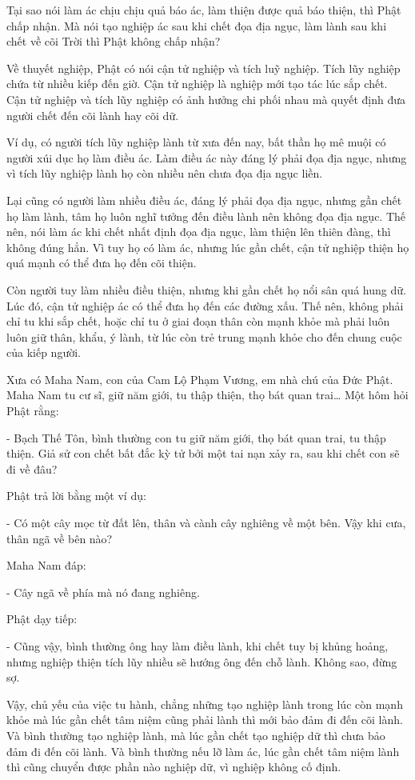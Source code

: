 \documentclass[
  12pt,
  oneside]{book}
\begin{document}
Tại sao nói làm ác chịu chịu quả báo ác, làm thiện được quả báo thiện, thì Phật chấp nhận. Mà nói tạo nghiệp ác sau khi chết đọa địa ngục, làm lành sau khi chết về cõi Trời thì Phật không chấp nhận?

Về thuyết nghiệp, Phật có nói cận tử nghiệp và tích luỹ nghiệp. Tích lũy nghiệp chứa từ nhiều kiếp đến giờ. Cận tử nghiệp là nghiệp mới tạo tác lúc sắp chết. Cận tử nghiệp và tích lũy nghiệp có ảnh hưởng chi phối nhau mà quyết định đưa người chết đến cõi lành hay cõi dữ.

Ví dụ, có người tích lũy nghiệp lành từ xưa đến nay, bất thần họ mê muội có người xúi dục họ làm điều ác. Làm điều ác này đáng lý phải đọa địa ngục, nhưng vì tích lũy nghiệp lành họ còn nhiều nên chưa đọa địa ngục liền.

Lại cũng có người làm nhiều điều ác, đáng lý phải đọa địa ngục, nhưng gần chết họ làm lành, tâm họ luôn nghĩ tưởng đến điều lành nên không đọa địa ngục. Thế nên, nói làm ác khi chết nhất định đọa địa ngục, làm thiện lên thiên đàng, thì không đúng hẳn. Vì tuy họ có làm ác, nhưng lúc gần chết, cận tử nghiệp thiện họ quá mạnh có thể đưa họ đến cõi thiện.

Còn người tuy làm nhiều điều thiện, nhưng khi gần chết họ nổi sân quá hung dữ. Lúc đó, cận tử nghiệp ác có thể đưa họ đến các đường xấu. Thế nên, không phải chỉ tu khi sắp chết, hoặc chỉ tu ở giai đoạn thân còn mạnh khỏe mà phải luôn luôn giữ thân, khẩu, ý lành, từ lúc còn trẻ trung mạnh khỏe cho đến chung cuộc của kiếp người.

Xưa có Maha Nam, con của Cam Lộ Phạm Vương, em nhà chú của Đức Phật. Maha Nam tu cư sĩ, giữ năm giới, tu thập thiện, thọ bát quan trai\ldots{} Một hôm hỏi Phật rằng:

- Bạch Thế Tôn, bình thường con tu giữ năm giới, thọ bát quan trai, tu thập thiện. Giả sử con chết bất đắc kỳ tử bởi một tai nạn xảy ra, sau khi chết con sẽ đi về đâu?

Phật trả lời bằng một ví dụ:

- Có một cây mọc từ đất lên, thân và cành cây nghiêng về một bên. Vậy khi cưa, thân ngã về bên nào?

Maha Nam đáp:

- Cây ngã về phía mà nó đang nghiêng.

Phật dạy tiếp:

- Cũng vậy, bình thường ông hay làm điều lành, khi chết tuy bị khủng hoảng, nhưng nghiệp thiện tích lũy nhiều sẽ hướng ông đến chỗ lành. Không sao, đừng sợ.

Vậy, chủ yếu của việc tu hành, chẳng những tạo nghiệp lành trong lúc còn mạnh khỏe mà lúc gần chết tâm niệm cũng phải lành thì mới bảo đảm đi đến cõi lành. Và bình thường tạo nghiệp lành, mà lúc gần chết tạo nghiệp dữ thì chưa bảo đảm đi đến cõi lành. Và bình thường nếu lỡ làm ác, lúc gần chết tâm niệm lành thì cũng chuyển được phần nào nghiệp dữ, vì nghiệp không cố định.
\end{document}
